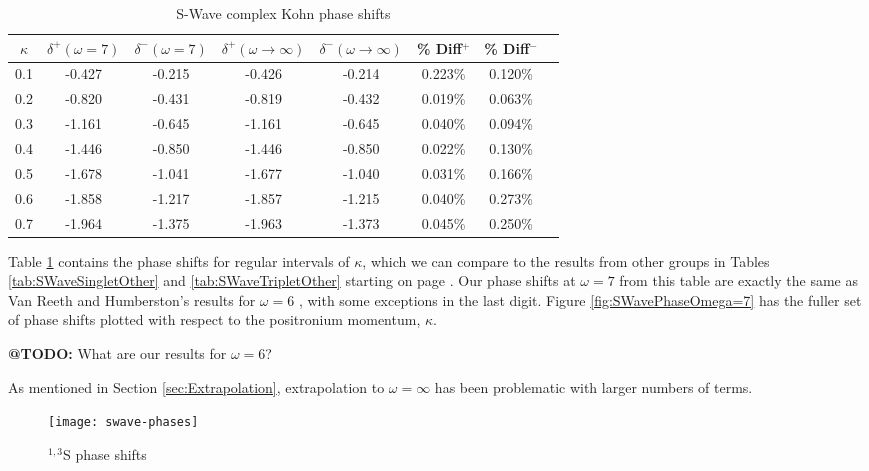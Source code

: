 \documentclass[Dissertation.tex]{subfiles}
\begin{document}
\begin{table}[H]
\centering
\begin{tabular}{c c c c c c c c}
\toprule
$\kappa$ & $\delta^+ (\omega = 7)$ & $\delta^- (\omega = 7)$ & $\delta^+ (\omega \rightarrow \infty)$ & $\delta^- (\omega \rightarrow \infty)$ & \% Diff$^+$ & \% Diff$^-$ \\
\midrule
0.1 & -0.427 & -0.215 & -0.426 & -0.214 & 0.223\% & 0.120\% \\
0.2 & -0.820 & -0.431 & -0.819 & -0.432 & 0.019\% & 0.063\% \\
0.3 & -1.161 & -0.645 & -1.161 & -0.645 & 0.040\% & 0.094\% \\
0.4 & -1.446 & -0.850 & -1.446 & -0.850 & 0.022\% & 0.130\% \\
0.5 & -1.678 & -1.041 & -1.677 & -1.040 & 0.031\% & 0.166\% \\
0.6 & -1.858 & -1.217 & -1.857 & -1.215 & 0.040\% & 0.273\% \\
0.7 & -1.964 & -1.375 & -1.963 & -1.373 & 0.045\% & 0.250\% \\
\bottomrule
\end{tabular}
\caption{S-Wave complex Kohn phase shifts}
\label{tab:SWavePhase}
\end{table}

Table \ref{tab:SWavePhase} contains the phase shifts for regular intervals of $\kappa$, which we can compare to the results from other groups in Tables \ref{tab:SWaveSingletOther} and \ref{tab:SWaveTripletOther} starting on page \pageref{tab:SWaveSingletOther}.  Our phase shifts at $\omega = 7$ from this table are exactly the same as Van Reeth and Humberston's results for $\omega = 6$ \cite{VanReeth2003}, with some exceptions in the last digit.  Figure \ref{fig:SWavePhaseOmega=7} has the fuller set of phase shifts plotted with respect to the positronium momentum, $\kappa$.

\textbf{@TODO:} What are our results for $\omega = 6$?

As mentioned in Section \ref{sec:Extrapolation}, extrapolation to $\omega = \infty$ has been problematic with larger numbers of terms.

\begin{figure}[H]
	\centering
	\texttt{[image: swave-phases]}
	\caption{$^{1,3}$S phase shifts}
	\label{fig:SWavePhase}
\end{figure}
\end{document}
